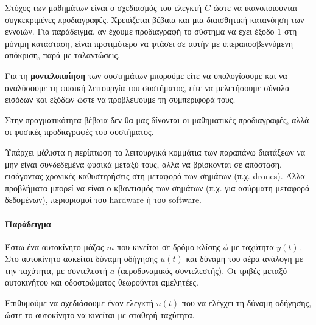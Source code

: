 \documentclass[11pt,a4paper,notitlepage,fleqn,final]{article}
\begin{document}
Στόχος των μαθημάτων είναι ο σχεδιασμός του ελεγκτή \( C \) ώστε να ικανοποιούνται
συγκεκριμένες προδιαγραφές. Χρειάζεται βέβαια και μια διαισθητική κατανόηση των εννοιών.
Για παράδειγμα, αν έχουμε προδιαγραφή το σύστημα να έχει έξοδο \( 1 \) στη μόνιμη κατάσταση,
είναι προτιμότερο να φτάσει σε αυτήν με υπεραποσβεννύμενη απόκριση, παρά με ταλαντώσεις.


Για τη \textbf{μοντελοποίηση} των συστημάτων μπορούμε είτε να υπολογίσουμε και να
αναλύσουμε τη φυσική λειτουργία του συστήματος, είτε να μελετήσουμε σύνολα εισόδων και
εξόδων ώστε να προβλέψουμε τη συμπεριφορά τους.

Στην πραγματικότητα βέβαια δεν θα μας δίνονται οι μαθηματικές προδιαγραφές, αλλά οι
φυσικές προδιαγραφές του συστήματος.

Υπάρχει μάλιστα η περίπτωση τα λειτουργικά κομμάτια των παραπάνω διατάξεων να μην
είναι συνδεδεμένα φυσικά μεταξύ τους, αλλά να βρίσκονται σε απόσταση, εισάγοντας
χρονικές καθυστερήσεις στη μεταφορά των σημάτων (π.χ. drones). Άλλα προβλήματα μπορεί
να είναι ο κβαντισμός των σημάτων (π.χ. για ασύρματη μεταφορά δεδομένων), περιορισμοί του
hardware ή του software.

\paragraph{Παράδειγμα}
Έστω ένα αυτοκίνητο μάζας \( m \) που κινείται σε δρόμο κλίσης \( \phi \) με ταχύτητα
\( y(t) \). Στο αυτοκίνητο ασκείται δύναμη οδήγησης \( u(t) \) και δύναμη του αέρα ανάλογη
με την ταχύτητα, με συντελεστή \( a \) (αεροδυναμικός συντελεστής).
Οι τριβές μεταξύ αυτοκινήτου και οδοστρώματος θεωρούνται αμελητέες.

Επιθυμούμε να σχεδιάσουμε έναν ελεγκτή \( u(t) \) που να ελέγχει τη δύναμη οδήγησης, ώστε
το αυτοκίνητο να κινείται με σταθερή ταχύτητα.
\end{document}
